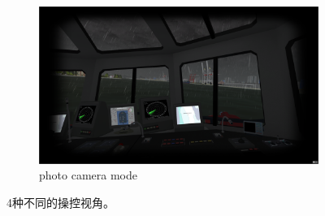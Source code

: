 \documentclass[letterpaper,10pt]{article}
\begin{document}
\begin{figure}[htbp]
\begin{subfigure}{0.45\textwidth}
						\includegraphics[width=\linewidth]{picture/photo camera mode}
						\captionsetup{font=scriptsize}
						\caption{photo camera mode}
						\label{fig: photo camera mode}	
					\end{subfigure}
					\captionsetup{font=scriptsize}
					\caption{
						\label{fig: View}						
						4种不同的操控视角。
					}
				\end{figure}

	
	
\end{document}
